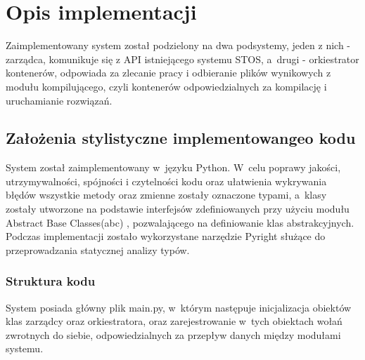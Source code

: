 \section{Opis implementacji}
Zaimplementowany system został podzielony na dwa podsystemy, jeden z nich - zarządca, komunikuje się z API istniejącego systemu STOS, a~drugi - orkiestrator kontenerów, odpowiada za zlecanie pracy i odbieranie plików wynikowych z modułu kompilującego, czyli kontenerów odpowiedzialnych za kompilację i uruchamianie rozwiązań.

\subsection{Założenia stylistyczne implementowangeo kodu}
System został zaimplementowany w~języku Python. W~celu poprawy jakości, utrzymywalności, spójności i czytelności kodu oraz ułatwienia wykrywania błędów wszystkie metody oraz zmienne zostały oznaczone typami, a~klasy zostały utworzone na podstawie interfejsów zdefiniowanych przy użyciu modułu Abstract Base Classes(abc) \cite{pythonAbc}, pozwalającego na definiowanie klas abstrakcyjnych. Podczas implementacji zostało wykorzystane narzędzie Pyright służące do przeprowadzania statycznej analizy typów.

\subsubsection{Struktura kodu}
System posiada główny plik main.py, w~którym następuje inicjalizacja obiektów klas zarządcy oraz orkiestratora, oraz zarejestrowanie w~tych obiektach wołań zwrotnych do siebie, odpowiedzialnych za przepływ danych między modułami systemu.
